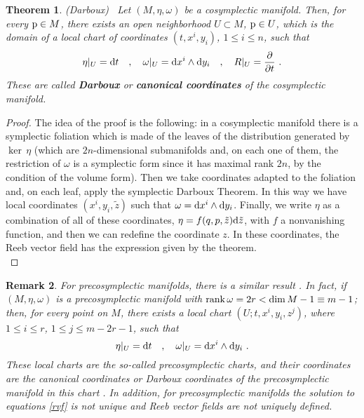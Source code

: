\documentclass[12pt]{report}
\newtheorem{teor}{Theorem}[chapter]
\newtheorem{remark}[teor]{Remark}
\def\derpar#1#2{\frac{\partial{#1}}{\partial{#2}}}
\def\qed{\ifvmode\removelastskip\fi
{\unskip\nobreak\hfil\penalty50\hbox{}\nobreak\hfil
\hbox{\vrule height1.2ex width1.2ex}\parfillskip=0pt
\finalhyphendemerits=0 \par\smallskip}}
\def\d{{\rm d}}
\begin{document}
\begin{teor} {\rm (Darboux)} \
Let $(M,\eta,\omega)$ be a cosymplectic manifold.
 Then, for every ${\rm p}\in M$, there exists an open neighborhood $U \subset M$, ${\rm p}\in U$, 
which is the domain of a local chart of coordinates $(t,x^i,y_i)$, 
$1\leq i \leq n$, such that
$$
\eta\vert_U=\d t \quad ,\quad 
\omega\vert_U=\d x^i\wedge\d y_i
\quad , \quad R\vert_U=\derpar{}{t} \ .
$$
These are called \textbf{Darboux} or \textbf{canonical coordinates}
of the cosymplectic manifold.
\label{darbo}
\end{teor}
\begin{proof}
The idea of the proof is the following:
in a cosymplectic manifold there is a symplectic foliation
which is made of  the leaves of the distribution generated by $\ker\,\eta$
(which are $2n$-dimensional submanifolds and, on each one of them, the restriction of $\omega$ is a symplectic form
since it has maximal rank $2n$, by the condition of the volume form).
Then we take coordinates adapted to the foliation and,
on each leaf, apply the symplectic Darboux Theorem.
In this way we have local coordinates $(x^i,y_i,\tilde z)$
such that $\omega=\d x^i\wedge\d y_i$.
Finally, we write $\eta$ as a combination of all of these coordinates,
$\eta=f(q,p,\tilde z)\d\tilde z$,
with $f$ a nonvanishing function, and then we can redefine the coordinate $z$.
In these coordinates, the Reeb vector field has the expression given by the theorem.
\\ \qed \end{proof}

\begin{remark}{\rm 
For precosymplectic manifolds, there is a similar result   \cite{dLe89}.
In fact, if $(M,\eta,\omega)$ is a precosymplectic manifold with ${\rm rank}\,\omega=2r<{\rm dim}\,M-1\equiv m-1$; then,
for every point on $M$, there exists a local chart $(U; t, x^i, y_i, z^j)$, where $1\leq i\leq r$, $1\leq j\leq m-2r-1$, such that
\begin{equation*}
\eta\vert_U=\d t\quad,\quad \omega\vert_U=\d x^i\wedge\d y_i \ .
\end{equation*}
These local charts are the so-called {\sl precosymplectic charts},
and their coordinates are the {\sl canonical coordinates} or 
{\sl  Darboux coordinates} of the precosymplectic manifold in this chart \cite{dLGRR-2023}.
In addition, for precosymplectic manifolds the solution to equations \eqref{rvf} is not unique
and Reeb vector fields are not uniquely defined.
}\end{remark}
\end{document}
